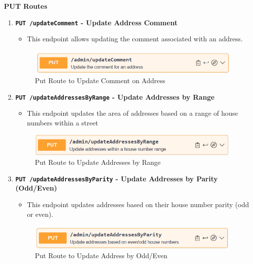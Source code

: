     \textbf{PUT Routes}
    \begin{enumerate}
        \item \textbf{\texttt{PUT /updateComment} - Update Address Comment}
        \begin{itemize}
            \item This endpoint allows updating the comment associated with an address.
        \end{itemize} 
        \begin{figure} [H]
            \centering
            \includegraphics [width=1\textwidth] {images/andreas/praxis/updateComment.png}
            \caption{Put Route to Update Comment on Address}
        \end{figure}

        \item \textbf{\texttt{PUT /updateAddressesByRange} - Update Addresses by Range}
        \begin{itemize}
            \item This endpoint updates the area of addresses based on a range of house numbers within a street
        \end{itemize} 
        \begin{figure} [H]
            \centering
            \includegraphics [width=1\textwidth] {images/andreas/praxis/updateAddressesHouseRange.png}
            \caption{Put Route to Update Addresses by Range}
        \end{figure}

        \item \textbf{\texttt{PUT /updateAddressesByParity} - Update Addresses by Parity (Odd/Even)}
        \begin{itemize}
            \item This endpoint updates addresses based on their house number parity (odd or even).
        \end{itemize} 
        \begin{figure} [H]
            \centering
            \includegraphics [width=1\textwidth] {images/andreas/praxis/updateAddressesOddEven.png}
            \caption{Put Route to Update Address by Odd/Even}
        \end{figure}


\end{enumerate}

